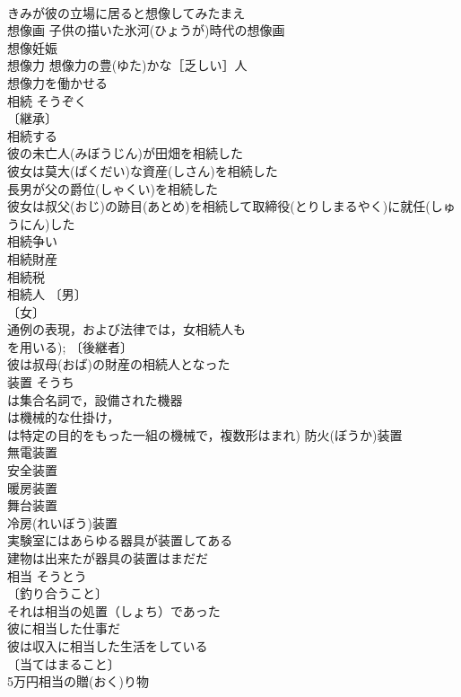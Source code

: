 \documentclass[8pt]{extreport}
\begin{document}
\begin{CJK}{UTF8}{min}
\\	きみが彼の立場に居ると想像してみたまえ 
\\	想像画 子供の描いた氷河(ひょうが)時代の想像画 
\\	想像妊娠 
\\	想像力 想像力の豊(ゆた)かな［乏しい］人 
\\	想像力を働かせる 
\\	相続	そうぞく	
\\	〔継承〕
\\	相続する 
\\	彼の未亡人(みぼうじん)が田畑を相続した 
\\	彼女は莫大(ばくだい)な資産(しさん)を相続した 
\\	長男が父の爵位(しゃくい)を相続した 
\\	彼女は叔父(おじ)の跡目(あとめ)を相続して取締役(とりしまるやく)に就任(しゅうにん)した 
\\	相続争い 
\\	相続財産 
\\	相続税 
\\	相続人 〔男〕
\\	〔女〕
\\	通例の表現，および法律では，女相続人も
\\	を用いる); 〔後継者〕
\\	彼は叔母(おば)の財産の相続人となった 
\\	装置	そうち	
\\	は集合名詞で，設備された機器
\\	は機械的な仕掛け，
\\	は特定の目的をもった一組の機械で，複数形はまれ) 防火(ぼうか)装置 
\\	無電装置 
\\	安全装置 
\\	暖房装置 
\\	舞台装置 
\\	冷房(れいぼう)装置 
\\	実験室にはあらゆる器具が装置してある 
\\	建物は出来たが器具の装置はまだだ 
\\	相当	そうとう	
\\	〔釣り合うこと〕
\\	それは相当の処置（しょち）であった 
\\	彼に相当した仕事だ 
\\	彼は収入に相当した生活をしている 
\\	〔当てはまること〕
\\	5万円相当の贈(おく)り物 

\end{CJK}
\end{document}
